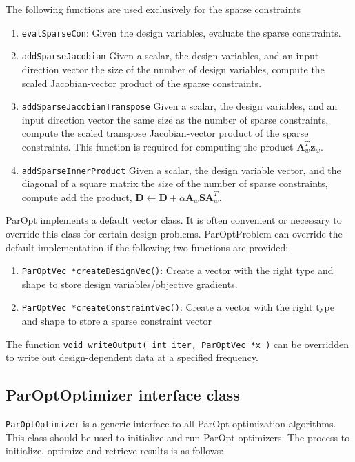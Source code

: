 \documentclass[12pt]{article}
\newcommand{\mb}{\mathbf}
\begin{document}
The following functions are used exclusively for the sparse constraints
%
\begin{enumerate}
\item \texttt{evalSparseCon}: Given the design variables, evaluate the sparse constraints.

\item \texttt{addSparseJacobian} Given a scalar, the design variables, and an input direction vector the size of the number of design variables, compute the scaled Jacobian-vector product of the sparse constraints.

\item \texttt{addSparseJacobianTranspose} Given a scalar, the design variables, and an input direction vector the same size as the number of sparse constraints, compute the scaled transpose Jacobian-vector product of the sparse constraints. This function is required for computing the product $\mb{A}_{w}^{T}\mb{z}_{w}$.

\item \texttt{addSparseInnerProduct} Given a scalar, the design variable vector, and the diagonal of a square matrix the size of the number of sparse constraints, compute add the product, $\mb{D} \leftarrow \mb{D} + \alpha \mb{A}_{w} \mb{S}\mb{A}_{w}^{T}$.
\end{enumerate}


ParOpt implements a default vector class.
It is often convenient or necessary to override this class for certain design problems.
ParOptProblem can override the default implementation if the following two functions are provided:
\begin{enumerate}
\item \texttt{ParOptVec *createDesignVec()}: Create a vector with the right type and shape to store design variables/objective gradients.
\item \texttt{ParOptVec *createConstraintVec()}: Create a vector with the right type and shape to store a sparse constraint vector
\end{enumerate}

The function \texttt{void writeOutput( int iter, ParOptVec *x )} can be overridden to write out design-dependent data at a specified frequency.

\subsection{ParOptOptimizer interface class}

\texttt{ParOptOptimizer} is a generic interface to all ParOpt optimization algorithms.
This class should be used to initialize and run ParOpt optimizers.
The process to initialize, optimize and retrieve results is as follows:
\end{document}
